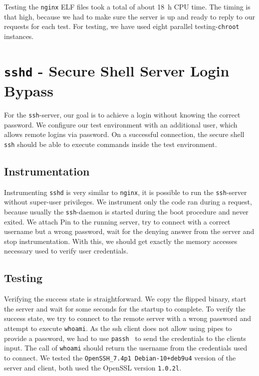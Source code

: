 Testing the \texttt{nginx} ELF files took a total of about \SI{18}{\hour} CPU
time. The timing is that high, because we had to make sure the server is up and
ready to reply to our requests for each test. For testing, we have used eight
parallel testing-\texttt{chroot} instances.

\section{\texttt{sshd} - Secure Shell Server Login Bypass}

For the \texttt{ssh}-server, our goal is to achieve a login without knowing the
correct password. We configure our test environment with an additional user,
which allows remote logins via password. On a successful connection, the secure
shell \texttt{ssh} should be able to execute commands inside the test
environment.

\subsection{Instrumentation}

Instrumenting \texttt{sshd} is very similar to \texttt{nginx}, it is possible to
run the \texttt{ssh}-server without super-user privileges. We instrument only
the code ran during a request, because usually the \texttt{ssh}-daemon is
started during the boot procedure and never exited. We attach Pin to the running
server, try to connect with a correct username but a wrong password, wait for
the denying answer from the server and stop instrumentation.  With this, we
should get exactly the memory accesses necessary used to verify user
credentials.

\subsection{Testing}

Verifying the success state is straightforward. We copy the flipped binary,
start the server and wait for some seconds for the startup to complete. To
verify the success state, we try to connect to the remote server with a wrong
password and attempt to execute \texttt{whoami}. As the ssh client does not
allow using pipes to provide a password, we had to use
\texttt{passh}~\cite{passhweb} to send the credentials to the
client\textquotesingle s input. The call of \texttt{whoami} should return the
username from the credentials used to connect. We tested the
\texttt{OpenSSH\_7.4p1 Debian-10+deb9u4} version of the server and client, both
used the OpenSSL version \texttt{1.0.2l}.

